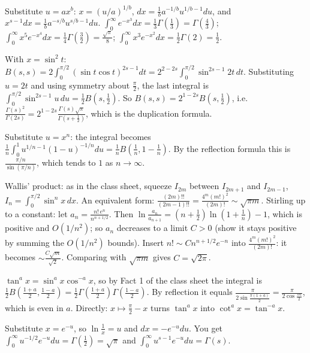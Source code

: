 \documentclass[11pt,a4paper]{article}
\begin{document}

Substitute \(u=ax^b\): \(x=(u/a)^{1/b}\), \(dx=\frac1b a^{-1/b}u^{1/b-1}du\), and \(x^{s-1}dx=\frac1ba^{-s/b}u^{s/b-1}du\).
\(\int_0^\infty e^{-x^3}dx=\frac13\Gamma(\frac13)=\Gamma(\frac43)\); \(\int_0^\infty x^5e^{-x^4}dx=\frac14\Gamma(\frac32)=\frac{\sqrt\pi}8\); \(\int_0^\infty x^3e^{-x^2}dx=\frac12\Gamma(2)=\frac12\).

With \(x=\sin^2t\): \(B(s,s)=2\int_0^{\pi/2}(\sin t\cos t)^{2s-1}dt=2^{2-2s}\int_0^{\pi/2}\sin^{2s-1}2t\,dt\).
Substituting \(u=2t\) and using symmetry about \(\frac\pi2\), the last integral is \(\int_0^{\pi/2}\sin^{2s-1}u\,du=\frac12B(s,\frac12)\). So \(B(s,s)=2^{1-2s}B(s,\frac12)\), i.e.~\(\frac{\Gamma(s)^2}{\Gamma(2s)}=2^{1-2s}\frac{\Gamma(s)\sqrt\pi}{\Gamma(s+\frac12)}\), which is the duplication formula.

Substitute \(u=x^n\): the integral becomes \(\frac1n\int_0^1u^{1/n-1}(1-u)^{-1/n}du=\frac1nB\left(\frac1n,1-\frac1n\right)\).
By the reflection formula this is \(\frac{\pi/n}{\sin(\pi/n)}\), which tends to \(1\) as \(n\to\infty\).

Wallis' product: as in the class sheet, squeeze \(I_{2m}\) between \(I_{2m+1}\) and \(I_{2m-1}\), \(I_n=\int_0^{\pi/2}\sin^nx\,dx\). An equivalent form: \(\frac{(2m)!!}{(2m-1)!!}=\frac{4^m(m!)^2}{(2m)!}\sim\sqrt{\pi m}\).
Stirling up to a constant: let \(a_n=\frac{n!\,e^n}{n^{n+1/2}}\). Then \(\ln\frac{a_n}{a_{n+1}}=(n+\frac12)\ln(1+\frac1n)-1\), which is positive and \(O(1/n^2)\); so \(a_n\) decreases to a limit \(C\gt0\) (show it stays positive by summing the \(O(1/n^2)\) bounds).
Insert \(n!\sim Cn^{n+1/2}e^{-n}\) into \(\frac{4^m(m!)^2}{(2m)!}\): it becomes \(\sim\frac{C\sqrt m}{\sqrt2}\). Comparing with \(\sqrt{\pi m}\) gives \(C=\sqrt{2\pi}\).

\(\tan^ax=\sin^ax\cos^{-a}x\), so by Fact 1 of the class sheet the integral is \(\frac12B\left(\frac{1+a}2,\frac{1-a}2\right)=\frac12\Gamma\left(\frac{1+a}2\right)\Gamma\left(\frac{1-a}2\right)\).
By reflection it equals \(\frac{\pi}{2\sin\frac{\pi(1+a)}2}=\frac\pi{2\cos\frac{\pi a}2}\), which is even in \(a\). Directly: \(x\mapsto\frac\pi2-x\) turns \(\tan^ax\) into \(\cot^ax=\tan^{-a}x\).

Substitute \(x=e^{-u}\), so \(\ln\frac1x=u\) and \(dx=-e^{-u}du\).
You get \(\int_0^\infty u^{-1/2}e^{-u}du=\Gamma(\frac12)=\sqrt\pi\) and \(\int_0^\infty u^{s-1}e^{-u}du=\Gamma(s)\).
\end{document}
